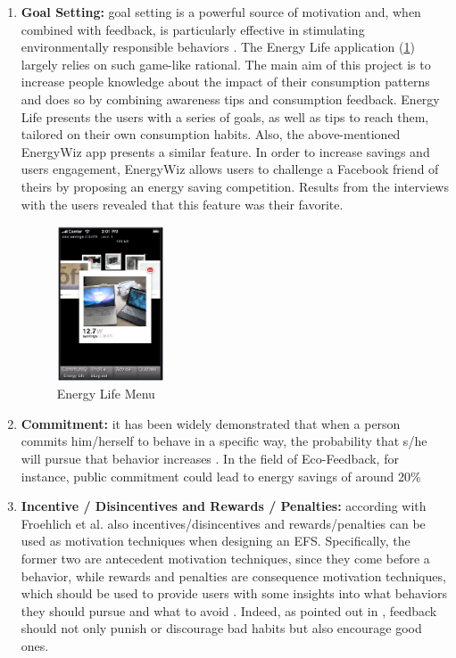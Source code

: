 \begin{enumerate}
\begin{itemize}
\end{itemize}

\item \textbf{Goal Setting:}
goal setting is a powerful source of motivation and, when combined with feedback, is particularly effective in stimulating environmentally responsible behaviors \cite{Froehlich2010}. The Energy Life application \cite{Giulio2009}(\cref{fig:energylife}) largely relies on such game-like rational. The main aim of this project is to increase people knowledge about the impact of their consumption patterns and does so by combining awareness tips and consumption feedback. Energy Life presents the users with a series of goals, as well as tips to reach them, tailored on their own consumption habits. Also, the above-mentioned EnergyWiz app \cite{Petkov2011} presents a similar feature. In order to increase savings and users engagement, EnergyWiz allows users to challenge a Facebook friend of theirs by proposing an energy saving competition. Results from the interviews with the users revealed that this feature was their favorite. 

\begin{figure}[h]
\centering
\includegraphics[width=0.3\textwidth]{./Images/energylife}
\caption{Energy Life Menu}
\label{fig:energylife}
\end{figure}

\item \textbf{Commitment:}
it has been widely demonstrated that when a person commits him/herself to behave in a specific way, the probability that s/he will pursue that behavior increases \cite{Froehlich2010}. In the field of Eco-Feedback, for instance, public commitment could lead to energy savings of around 20\% \cite{CommitmentandVoluntaryEnergyConservation}

\item \textbf{Incentive / Disincentives and Rewards / Penalties:}
according with Froehlich et al. \cite{Froehlich2010} also incentives/disincentives and rewards/penalties can be used as motivation techniques when designing an \ac{EFS}. Specifically, the former two are antecedent motivation techniques, since they come before a behavior, while rewards and penalties are consequence motivation techniques, which should be used to provide users with some insights into what behaviors they should pursue and what to avoid \cite{Froehlich2010}. Indeed, as pointed out in \cite{Giulio2009}, feedback should not only punish or discourage bad habits but also encourage good ones.


\end{enumerate}
